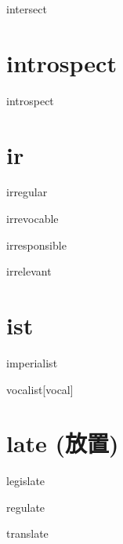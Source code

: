 \begin{RefWord}{intersect}
\end{RefWord}

\section{introspect}

\begin{RefWord}{introspect}
\end{RefWord}

\section{ir} 

\begin{RefWord}{irregular}
\end{RefWord}

\begin{RefWord}{irrevocable}
\end{RefWord}

\begin{RefWord}{irresponsible}
\end{RefWord}

\begin{RefWord}{irrelevant}
\end{RefWord}

\section{ist}

\begin{RefWord}{imperialist}
\end{RefWord}

\begin{RefWord}{vocalist}[vocal]
\end{RefWord}

\section{late (放置)}

\begin{RefWord}{legislate}
\end{RefWord}

\begin{RefWord}{regulate}
\end{RefWord}

\begin{RefWord}{translate}
\end{RefWord}

